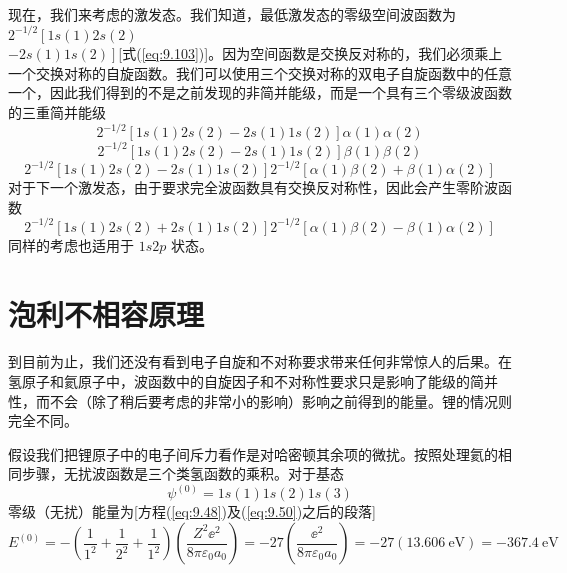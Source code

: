     现在，我们来考虑的激发态。我们知道，最低激发态的零级空间波函数为$2^{-1/2}\left[1s\left(1\right)2s\left(2\right) \right.$\\$\left. - 2s\left(1\right)1s\left(2\right)\right]$[式(\ref{eq:9.103})]。因为空间函数是交换反对称的，我们必须乘上一个交换对称的自旋函数。我们可以使用三个交换对称的双电子自旋函数中的任意一个，因此我们得到的不是之前发现的非简并能级，而是一个具有三个零级波函数的三重简并能级
    \begin{equation}
        2^{-1/2}\left[1s\left(1\right)2s\left(2\right) - 2s\left(1\right)1s\left(2\right)\right]\alpha\left(1\right)\alpha\left(2\right)
        \label{eq:10.27}
    \end{equation}
    \begin{equation}
        2^{-1/2}\left[1s\left(1\right)2s\left(2\right) - 2s\left(1\right)1s\left(2\right)\right]\beta\left(1\right)\beta\left(2\right)
        \label{eq:10.28}
    \end{equation}
    \begin{equation}
        2^{-1/2}\left[1s\left(1\right)2s\left(2\right) - 2s\left(1\right)1s\left(2\right)\right]2^{-1/2}\left[\alpha\left(1\right)\beta\left(2\right) + \beta\left(1\right)\alpha\left(2\right)\right]
        \label{eq:10.29}
    \end{equation}
    对于下一个激发态，由于要求完全波函数具有交换反对称性，因此会产生零阶波函数
    \begin{equation}
        2^{-1/2}\left[1s\left(1\right)2s\left(2\right) + 2s\left(1\right)1s\left(2\right)\right]2^{-1/2}\left[\alpha\left(1\right)\beta\left(2\right) - \beta\left(1\right)\alpha\left(2\right)\right]
        \label{eq:10.30}
    \end{equation}
    同样的考虑也适用于 $1s2p$ 状态。

\section{泡利不相容原理}
\label{sec:10.5 The Pauli Exclusion Principle}

    到目前为止，我们还没有看到电子自旋和不对称要求带来任何非常惊人的后果。在氢原子和氦原子中，波函数中的自旋因子和不对称性要求只是影响了能级的简并性，而不会（除了稍后要考虑的非常小的影响）影响之前得到的能量。锂的情况则完全不同。

    假设我们把锂原子中的电子间斥力看作是对哈密顿其余项的微扰。按照处理氦的相同步骤，无扰波函数是三个类氢函数的乘积。对于基态
    \begin{equation}
        \psi^{\left(0\right)} = 1s\left(1\right)1s\left(2\right)1s\left(3\right)
        \label{eq:10.31}
    \end{equation}
    零级（无扰）能量为[方程(\ref{eq:9.48})及(\ref{eq:9.50})之后的段落]
    \begin{equation*}
        E^{\left(0\right)} = -\left(\frac{1}{1^2} + \frac{1}{2^2} + \frac{1}{1^2}\right)\left(\frac{Z^2\ee ^2}{8\pi \varepsilon_0a_0}\right) = -27 \left(\frac{\ee ^2}{8\pi \varepsilon_0a_0}\right) = -27  \left(13.606 \: \mathrm{eV}\right) = -367.4 \: \mathrm{eV}
    \end{equation*}

